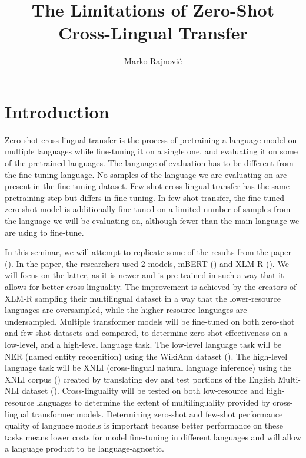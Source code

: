 \documentclass[times, utf8, seminar, english]{fer}
\begin{document}
\title{The Limitations of Zero-Shot Cross-Lingual Transfer}


\author{Marko Rajnović}
\maketitle


\tableofcontents

\chapter[Introduction]{Introduction}
Zero-shot cross-lingual transfer is the process of pretraining a language model on multiple languages while fine-tuning it on a single one, and evaluating it on some of the pretrained languages. The language of evaluation has to be different from the fine-tuning language. No samples of the language we are evaluating on are present in the fine-tuning dataset. Few-shot cross-lingual transfer has the same pretraining step but differs in fine-tuning. In few-shot transfer, the fine-tuned zero-shot model is additionally fine-tuned on a limited number of samples from the language we will be evaluating on, although fewer than the main language we are using to fine-tune. 
\par
In this seminar, we will attempt to replicate some of the results from the paper (\cite{zero}). In the paper, the researchers used 2 models, mBERT (\cite{devlin-etal-2019-bert}) and XLM-R (\cite{conneau2019unsupervised}). We will focus on the latter, as it is newer and is pre-trained in such a way that it allows for better cross-linguality. The improvement is achieved by the creators of XLM-R sampling their multilingual dataset in a way that the lower-resource languages are oversampled, while the higher-resource languages are undersampled.  Multiple transformer models will be fine-tuned on both zero-shot and few-shot datasets and compared, to determine zero-shot effectiveness on a low-level, and a high-level language task. The low-level language task will be NER (named entity recognition) using the WikiAnn dataset (\cite{pan-etal-2017-cross}). The high-level language task will be XNLI (cross-lingual natural language inference) using the XNLI corpus (\cite{conneau-etal-2018-xnli}) created by translating dev and test portions of the English Multi-NLI dataset (\cite{williams-etal-2018-broad}). Cross-linguality will be tested on both low-resource and high-resource languages to determine the extent of multilinguality provided by cross-lingual transformer models. Determining zero-shot and few-shot performance quality of language models is important because better performance on these tasks means lower costs for model fine-tuning in different languages and will allow a language product to be language-agnostic.
\end{document}
